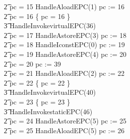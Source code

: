 \begin{figure}[tp!]
\begin{minipage}{0.5\textwidth}
{\begin{circus}
    \t2 {} \circelse pc = 15 \circthen HandleAloadEPC(1) \circseq pc := 16 \\
    \t2 {} \circelse pc = 16 \circthen \{ pc = 16 \} \circseq \\
    \t3 HandleInvokevirtualEPC(36) \\
    \t2 {} \circelse pc = 17 \circthen HandleAstoreEPC(3) \circseq pc := 18 \\
    \t2 {} \circelse pc = 18 \circthen HandleIconstEPC(0) \circseq pc := 19 \\
    \t2 {} \circelse pc = 19 \circthen HandleAstoreEPC(4) \circseq pc := 20 \\
    \t2 {} \circelse pc = 20 \circthen pc := 39 \\
    \t2 {} \circelse pc = 21 \circthen HandleAloadEPC(2) \circseq pc := 22 \\
    \t2 {} \circelse pc = 22 \circthen \{ pc = 22 \} \circseq \\
    \t3 HandleInvokevirtualEPC(40) \\
    \t2 {} \circelse pc = 23 \circthen \{ pc = 23 \} \circseq \\
    \t3 HandleInvokestaticEPC(46) \\
    \t2 {} \circelse pc = 24 \circthen HandleAstoreEPC(5) \circseq pc := 25 \\
    \t2 {} \circelse pc = 25 \circthen HandleAloadEPC(5) \circseq pc := 26 \\
  \end{circus}
  }
  \end{minipage}
  \begin{minipage}{0.5\textwidth}
\end{minipage}
\end{figure}
